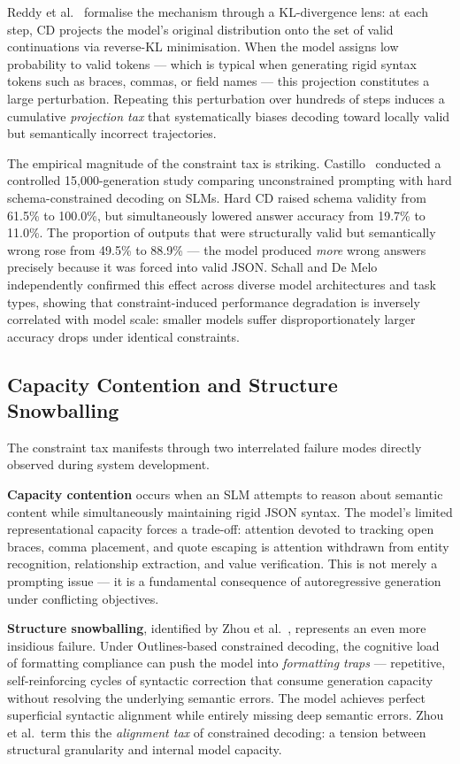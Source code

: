 \documentclass{ceurart}
\begin{document}
Reddy et al.~\cite{Reddy2026} formalise the mechanism through a KL-divergence lens:
at each step, CD projects the model's original distribution onto the set of valid
continuations via reverse-KL minimisation.
When the model assigns low probability to valid tokens --- which is typical when
generating rigid syntax tokens such as braces, commas, or field names --- this
projection constitutes a large perturbation.
Repeating this perturbation over hundreds of steps induces a cumulative
\emph{projection tax} that systematically biases decoding toward locally valid but
semantically incorrect trajectories.

The empirical magnitude of the constraint tax is striking.
Castillo~\cite{Castillo2025} conducted a controlled 15,000-generation study comparing
unconstrained prompting with hard schema-constrained decoding on SLMs.
Hard CD raised schema validity from 61.5\% to 100.0\%, but simultaneously lowered
answer accuracy from 19.7\% to 11.0\%.
The proportion of outputs that were structurally valid but semantically wrong rose
from 49.5\% to 88.9\% --- the model produced \emph{more} wrong answers precisely
because it was forced into valid JSON.
Schall and De Melo~\cite{Schall2025} independently confirmed this effect across
diverse model architectures and task types, showing that constraint-induced
performance degradation is inversely correlated with model scale: smaller models
suffer disproportionately larger accuracy drops under identical constraints.

\subsection{Capacity Contention and Structure Snowballing}

The constraint tax manifests through two interrelated failure modes directly observed
during system development.

\textbf{Capacity contention} occurs when an SLM attempts to reason about semantic
content while simultaneously maintaining rigid JSON syntax.
The model's limited representational capacity forces a trade-off: attention devoted
to tracking open braces, comma placement, and quote escaping is attention withdrawn
from entity recognition, relationship extraction, and value verification.
This is not merely a prompting issue --- it is a fundamental consequence of
autoregressive generation under conflicting objectives.

\textbf{Structure snowballing}, identified by Zhou et al.~\cite{Zhou2025}, represents
an even more insidious failure.
Under Outlines-based constrained decoding, the cognitive load of formatting compliance
can push the model into \emph{formatting traps} --- repetitive, self-reinforcing
cycles of syntactic correction that consume generation capacity without resolving the
underlying semantic errors.
The model achieves perfect superficial syntactic alignment while entirely missing deep
semantic errors.
Zhou et al.~term this the \emph{alignment tax} of constrained decoding: a tension
between structural granularity and internal model capacity.
\end{document}
